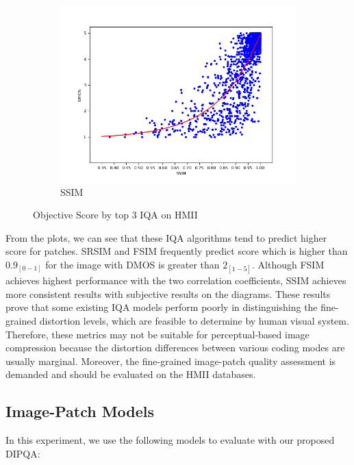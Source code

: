 \begin{figure}[H]
  \begin{subfigure}[b]{0.5\textwidth}
    \includegraphics[width=\textwidth]{figures/ssim.png}
    \caption{SSIM}
    \label{fig:ssim}
  \end{subfigure}
  \caption{Objective Score by top 3 IQA on HMII}\label{fig:animals}
\end{figure}

From the plots, we can see that these IQA algorithms tend to predict higher score for patches. 
SRSIM and FSIM frequently predict score which is higher than $0.9_{[0-1]}$ for the image with DMOS is greater than $2_{[1-5]}$.
Although FSIM achieves highest performance with the two correlation coefficients, SSIM achieves more consistent results with subjective results on the diagrams.
These
results prove that some existing IQA models perform poorly
in distinguishing the fine-grained distortion levels, which are
feasible to determine by human visual system. Therefore, these
metrics may not be suitable for perceptual-based image compression because the distortion differences between various
coding modes are usually marginal. Moreover, the fine-grained
image-patch quality assessment is demanded and should be evaluated
on the HMII databases.

\subsection{Image-Patch Models}

In this experiment, we use the following models to evaluate with our proposed DIPQA:

